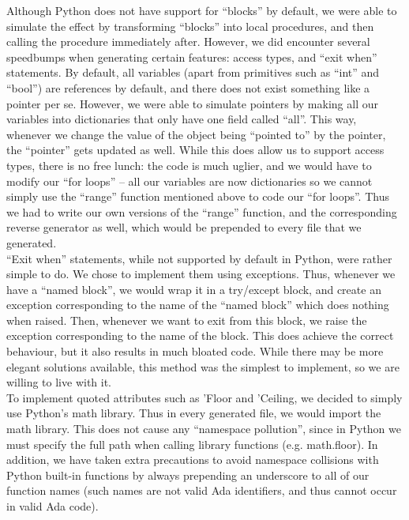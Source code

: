 \documentclass[onecolumn,11pt]{article}
\begin{document}
Although Python does not have support for ``blocks'' by default, we were able to simulate the effect by transforming ``blocks'' into local procedures, and then calling the procedure immediately after. However, we did encounter several speedbumps when generating certain features: access types, and ``exit when'' statements. By default, all variables (apart from primitives such as ``int'' and ``bool'') are references by default, and there does not exist something like a pointer per se. However, we were able to simulate pointers by making all our variables into dictionaries that only have one field called ``all''. This way, whenever we change the value of the object being ``pointed to'' by the pointer, the ``pointer'' gets updated as well. While this does allow us to support access types, there is no free lunch: the code is much uglier, and we would have to modify our ``for loops'' -- all our variables are now dictionaries so we cannot simply use the ``range'' function mentioned above to code our ``for loops''. Thus we had to write our own versions of the ``range'' function, and the corresponding reverse generator as well, which would be prepended to every file that we generated. \\

``Exit when'' statements, while not supported by default in Python, were rather simple to do. We chose to implement them using exceptions. Thus, whenever we have a ``named block'', we would wrap it in a try/except block, and create an exception corresponding to the name of the ``named block'' which does nothing when raised. Then, whenever we want to exit from this block, we raise the exception corresponding to the name of the block. This does achieve the correct behaviour, but it also results in much bloated code. While there may be more elegant solutions available, this method was the simplest to implement, so we are willing to live with it. \\

To implement quoted attributes such as 'Floor and 'Ceiling, we decided to simply use Python's math library. Thus in every generated file, we would import the math library. This does not cause any ``namespace pollution'', since in Python we must specify the full path when calling library functions (e.g. math.floor). In addition, we have taken extra precautions to avoid namespace collisions with Python built-in functions by always prepending an underscore to all of our function names (such names are not valid Ada identifiers, and thus cannot occur in valid Ada code). \\
\end{document}
